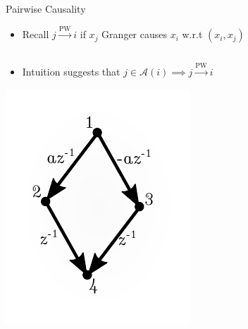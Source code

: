 \documentclass{beamer} %
\def\pwgc{\overset{\text{PW}}{\rightarrow}}  %
\newcommand{\anc}[1]{\mathcal{A}(#1)}  %
\begin{document}
\begin{frame}{Pairwise Causality}
  \begin{itemize}
    \item{Recall $j \pwgc i$ if $x_j$ Granger causes $x_i$ w.r.t $(x_i, x_j)$}\pause
  \end{itemize}
  
  \begin{columns}
    \begin{column}{0.5\textwidth}
      \begin{itemize}
        \item{Intuition suggests that $j \in \anc{i} \implies j \pwgc i$}\pause
      \end{itemize}

      \includegraphics[width=0.75\linewidth]{../../figures/example1.pdf}\pause
    \end{column}


\end{columns}
\end{frame}
\end{document}
